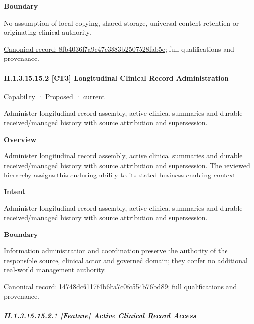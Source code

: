 \textbf{Boundary}



No assumption of local copying, shared storage, universal content retention or originating clinical authority.


{\footnotesize \href{../../../../continuum/strategy/capability/feature/8fb4036f7a9c47c3883b2507528fab5e.md}{Canonical record: 8fb4036f7a9c47c3883b2507528fab5e}; full qualifications and provenance.}\par
\paragraph*{II.1.3.15.15.2 [CT3] Longitudinal Clinical Record Administration}
\label{navigation:II.1.3.15.15.2}

\label{element:14748dc6117f4b6ba7c0fc554b76bd89}
{\small Capability · Proposed · current}\par

Administer longitudinal record assembly, active clinical summaries and durable received/managed history with source attribution and supersession.



\textbf{Overview}



Administer longitudinal record assembly, active clinical summaries and durable received/managed history with source attribution and supersession. The reviewed hierarchy assigns this enduring ability to its stated business-enabling context.



\textbf{Intent}



Administer longitudinal record assembly, active clinical summaries and durable received/managed history with source attribution and supersession.



\textbf{Boundary}



Information administration and coordination preserve the authority of the responsible source, clinical actor and governed domain; they confer no additional real-world management authority.


{\footnotesize \href{../../../../continuum/strategy/capability/14748dc6117f4b6ba7c0fc554b76bd89.md}{Canonical record: 14748dc6117f4b6ba7c0fc554b76bd89}; full qualifications and provenance.}\par
\subparagraph*{II.1.3.15.15.2.1 [Feature] Active Clinical Record Access}
\label{navigation:II.1.3.15.15.2.1}

